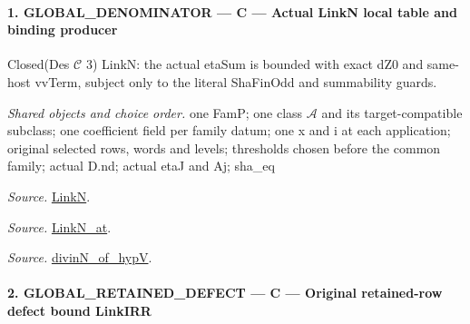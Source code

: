 \documentclass[11pt,a4paper]{article}
\numberwithin{equation}{section}
\theoremstyle{remark}\newtheorem{remark}[theorem]{Remark}
\begin{document}
\paragraph{1. GLOBAL\_\allowbreak DENOMINATOR — C — Actual LinkN local table and binding producer}

Closed(Des $\mathcal C$ 3) LinkN: the actual etaSum is bounded with exact dZ0 and same-host vvTerm, subject only to the literal ShaFinOdd and summability guards.

\emph{Shared objects and choice order.} one FamP; one class $\mathcal A$ and its target-compatible subclass; one coefficient field per family datum; one x and i at each application; original selected rows, words and levels; thresholds chosen before the common family; actual D.nd; actual etaJ and Aj; sha\_\allowbreak eq

\emph{Source.} \href{https://github.com/CocoSgt/riemann-hypothesis-lean/blob/7cbf7a0c32fca1badf05931879a37c3f8a2b03b4/src/Formalism/SharpRestriction/GlobalTheoremInputs.lean#L45-L48}{LinkN}.

\emph{Source.} \href{https://github.com/CocoSgt/riemann-hypothesis-lean/blob/7cbf7a0c32fca1badf05931879a37c3f8a2b03b4/src/Formalism/SharpRestriction/GlobalTheoremInputs.lean#L40-L44}{LinkN\_\allowbreak at}.

\emph{Source.} \href{https://github.com/CocoSgt/riemann-hypothesis-lean/blob/7cbf7a0c32fca1badf05931879a37c3f8a2b03b4/src/Development/AutomorphicArithmetic/CharacterBoxes/DivinNOfHypV.lean#L117-L134}{divinN\_\allowbreak of\_\allowbreak hypV}.



\paragraph{2. GLOBAL\_\allowbreak RETAINED\_\allowbreak DEFECT — C — Original retained-row defect bound LinkIRR}
\end{document}
